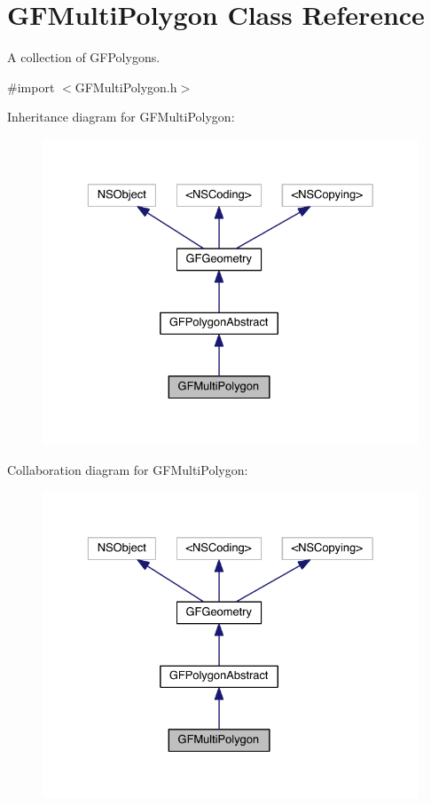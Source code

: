 \hypertarget{interface_g_f_multi_polygon}{}\section{G\+F\+Multi\+Polygon Class Reference}
\label{interface_g_f_multi_polygon}


A collection of G\+F\+Polygons.  




{\ttfamily \#import $<$G\+F\+Multi\+Polygon.\+h$>$}



Inheritance diagram for G\+F\+Multi\+Polygon\+:\nopagebreak
\begin{figure}[H]
\begin{center}
\leavevmode
\includegraphics[width=329pt]{interface_g_f_multi_polygon__inherit__graph}
\end{center}
\end{figure}


Collaboration diagram for G\+F\+Multi\+Polygon\+:\nopagebreak
\begin{figure}[H]
\begin{center}
\leavevmode
\includegraphics[width=329pt]{interface_g_f_multi_polygon__coll__graph}
\end{center}
\end{figure}
